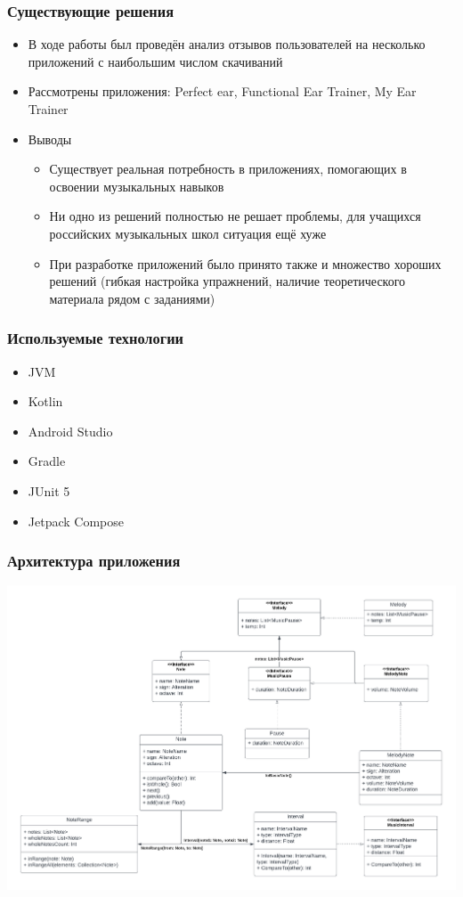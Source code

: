 \documentclass{beamer}
\begin{document}
\begin{frame}  
  \frametitle{Существующие решения}
  \begin{itemize}
    \item В ходе работы был проведён анализ отзывов пользователей на несколько приложений с наибольшим числом скачиваний
    \item Рассмотрены приложения: Perfect ear, Functional Ear Trainer, My Ear Trainer 
  \end{itemize}
  
    \begin{itemize}
    \item Выводы
    \begin{itemize}
      \item Существует реальная потребность в приложениях, помогающих в освоении музыкальных навыков
      \item Ни одно из решений полностью не решает проблемы, для учащихся российских музыкальных школ ситуация ещё хуже
      \item При разработке приложений было принято также и множество хороших решений (гибкая настройка упражнений, наличие теоретического материала рядом с заданиями)
    \end{itemize}
  \end{itemize}  
    
\end{frame}
            
\begin{frame}  
  \frametitle{Используемые технологии}
  \begin{itemize}
    \item JVM
    \item Kotlin
    \item Android Studio
    \item Gradle
    \item JUnit 5
    \item Jetpack Compose
  \end{itemize}   
\end{frame}             
            

\begin{frame}
  \frametitle{Архитектура приложения}
  \includegraphics[width=\textwidth]{../images/UML.pdf}
\end{frame}
\end{document}
